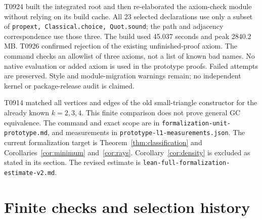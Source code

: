 \documentclass[11pt]{amsart}
\newcommand{\record}[1]{\nolinkurl{#1}}
\begin{document}
T0924 built the integrated root and then re-elaborated the axiom-check
module without relying on its build cache. All 23 selected declarations
use only a subset of \texttt{propext, Classical.choice, Quot.sound};
the path and adjacency correspondence use those three. The build used
45.037 seconds and peak 2840.2 MB. T0926 confirmed rejection of the
existing unfinished-proof axiom. The command checks an allowlist of
three axioms, not a list of known bad names. No native evaluation or
added axiom is used in the prototype proofs. Failed attempts are
preserved. Style and module-migration warnings remain; no independent
kernel or package-release audit is claimed.

T0914 matched all vertices and edges of the old small-triangle
constructor for the already known $k=2,3,4$. This finite comparison
does not prove general GC equivalence. The command and exact scope are
in \record{formalization-unit-prototype.md}, and measurements in
\record{prototype-l1-measurements.json}. The current formalization target
is Theorem~\ref{thm:classification} and
Corollaries~\ref{cor:minimum} and~\ref{cor:rays}.
Corollary~\ref{cor:density} is excluded as stated in its section.
The revised estimate is \record{lean-full-formalization-estimate-v2.md}.

\section{Finite checks and selection history}\label{sec:checks}
\end{document}
